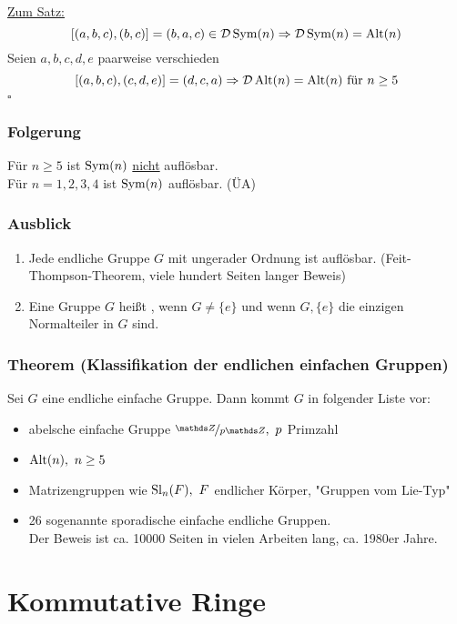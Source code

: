 \uline{Zum Satz:} 
\[
[(a,b,c),(b,c)]=(b,a,c)\in \mathcal{D} \operatorname{Sym}(n)\Rightarrow \mathcal{D}\operatorname{Sym}(n)=\operatorname{Alt}(n)
\]
Seien $a,b,c,d,e$ paarweise verschieden
\[
[(a,b,c),(c,d,e)]=(d,c,a)\Rightarrow \mathcal{D} \operatorname{Alt}(n)=\operatorname{Alt}(n)\text{ für }n\ge 5
\]
\hfill $\square$

\subsubsection*{Folgerung}
Für $n\ge 5$ ist $\operatorname{Sym}(n)$ \uline{nicht} auflösbar.\\
Für $n=1,2,3,4$ ist $\operatorname{Sym}(n)$ auflösbar. (ÜA)

\subsubsection*{Ausblick}
\begin{enumerate}[(1)]
	\item Jede endliche Gruppe $G$ mit ungerader Ordnung ist auflösbar. 
	(Feit-Thompson-Theorem, viele hundert Seiten langer Beweis)
	\item Eine Gruppe $G$ heißt , wenn $G\neq \{e\}$ und wenn $G,\{e\}$ die einzigen Normalteiler in $G$ sind.
\end{enumerate}

\subsubsection*{Theorem (Klassifikation der endlichen einfachen Gruppen)}
Sei $G$ eine endliche einfache Gruppe. 
Dann kommt $G$ in folgender Liste vor:
\begin{itemize}
	\item abelsche einfache Gruppe $\nicefrac{\Z}{p\Z},~p$ Primzahl
	\item $\operatorname{Alt}(n),~n\ge 5$
	\item Matrizengruppen wie $\operatorname{Sl}_n(F),~F$ endlicher Körper, "Gruppen vom Lie-Typ"
	\item 26 sogenannte sporadische einfache endliche Gruppen.\\
	Der Beweis ist ca. 10000 Seiten in vielen Arbeiten lang, ca. 1980er Jahre.
\end{itemize} 
\newpage

\section{Kommutative Ringe}
\label{sec:komm_ringe}
